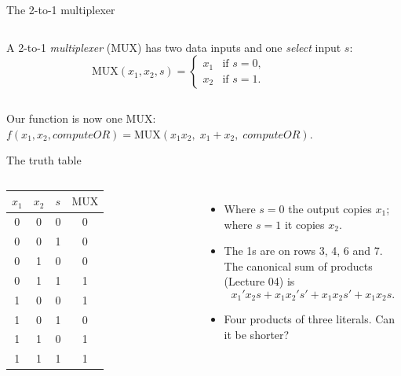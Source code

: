 \documentclass[10pt]{wosm-slides}
\begin{document}
\begin{frame}{The 2-to-1 multiplexer}
  \begin{columns}[c, totalwidth=\textwidth]
      \begin{definition}[Multiplexer]
        A 2-to-1 \emph{multiplexer} (MUX) has two data inputs and one
        \emph{select} input $s$:
        \[
          \mathrm{MUX}(x_1, x_2, s) =
            \begin{cases}
              x_1 & \text{if } s = 0, \\
              x_2 & \text{if } s = 1.
            \end{cases}
        \]
      \end{definition}
      \centering
  \end{columns}

  \bigskip
  Our function is now one MUX: \quad
  $f(x_1, x_2, \mathit{computeOR}) = \mathrm{MUX}(x_1 x_2,\; x_1 + x_2,\;
  \mathit{computeOR})$.
\end{frame}

\begin{frame}{The truth table}
  \begin{columns}[T, totalwidth=\textwidth]
      \centering
      \small
      \begin{tabular}{@{}ccc|c@{}}
        $x_1$ & $x_2$ & $s$ & $\mathrm{MUX}$ \\
        \midrule
        0 & 0 & 0 & 0 \\
        0 & 0 & 1 & 0 \\
        0 & 1 & 0 & 0 \\
        0 & 1 & 1 & 1 \\
        1 & 0 & 0 & 1 \\
        1 & 0 & 1 & 0 \\
        1 & 1 & 0 & 1 \\
        1 & 1 & 1 & 1 \\
      \end{tabular}
      \begin{itemize}
        \item Where $s = 0$ the output copies $x_1$; where $s = 1$ it copies $x_2$.
        \item The 1s are on rows 3, 4, 6 and 7. The canonical sum of products
          (Lecture 04) is
          \[ x_1'x_2s + x_1x_2's' + x_1x_2s' + x_1x_2s . \]
        \item Four products of three literals. Can it be shorter?
      \end{itemize}
  \end{columns}
\end{frame}
\end{document}
